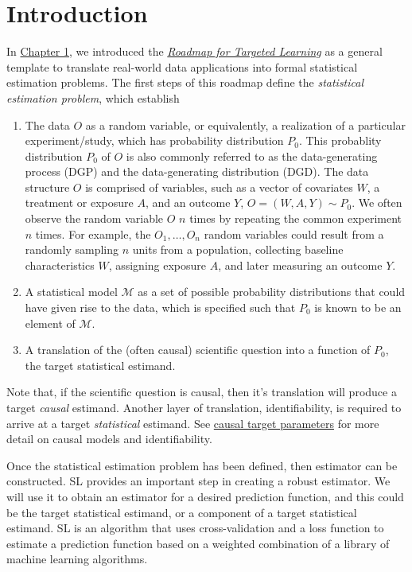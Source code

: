 \documentclass[12pt, krantz2,]{krantz}
\providecommand{\tightlist}{%
  \setlength{\itemsep}{0pt}\setlength{\parskip}{0pt}}
\theoremstyle{definition}
\theoremstyle{definition}
\theoremstyle{definition}
\newcommand{\1}{\mathbbm{1}}
\begin{document}
\hypertarget{introduction-2}{%
\section{Introduction}\label{introduction-2}}

In \protect\hyperlink{intro}{Chapter 1}, we introduced the \protect\hyperlink{roadmap}{\emph{Roadmap for Targeted
Learning}} as a general template to translate real-world data
applications into formal statistical estimation problems. The first steps of
this roadmap define the \emph{statistical estimation problem}, which establish

\begin{enumerate}
\def\labelenumi{\arabic{enumi}.}
\tightlist
\item
  The data \(O\) as a random variable, or equivalently, a realization of a
  particular experiment/study, which has probability distribution \(P_0\). This
  probablity distribution \(P_0\) of \(O\) is also commonly referred to as the
  data-generating process (DGP) and the data-generating distribution (DGD).
  The data structure \(O\) is comprised of variables, such as a vector of
  covariates \(W\), a treatment or exposure \(A\), and an outcome \(Y\),
  \(O=(W,A,Y) \sim P_0\). We often observe the random variable \(O\) \(n\) times
  by repeating the common experiment \(n\) times. For example, the
  \(O_1,\ldots, O_n\) random variables could result from a randomly sampling \(n\)
  units from a population, collecting baseline characteristics \(W\), assigning
  exposure \(A\), and later measuring an outcome \(Y\).
\item
  A statistical model \(\mathcal{M}\) as a set of possible probability
  distributions that could have given rise to the data, which is specified such
  that \(P_0\) is known to be an element of \(\mathcal{M}\).
\item
  A translation of the (often causal) scientific question into a function of
  \(P_0\), the target statistical estimand.
\end{enumerate}

Note that, if the scientific question is causal, then it's translation will
produce a target \emph{causal} estimand. Another layer of translation,
identifiability, is required to arrive at a target \emph{statistical} estimand. See
\protect\hyperlink{causal}{causal target parameters} for more detail on causal models and
identifiability.

Once the statistical estimation problem has been defined, then estimator can be
constructed. SL provides an important step in creating a robust estimator. We
will use it to obtain an estimator for a desired prediction function, and this
could be the target statistical estimand, or a component of a target statistical
estimand. SL is an algorithm that uses cross-validation and a loss function to
estimate a prediction function based on a weighted combination of a library of
machine learning algorithms.
\end{document}
